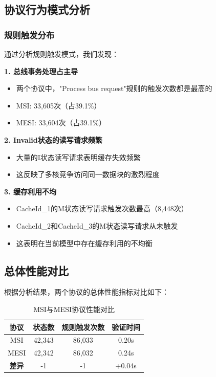 \documentclass[a4paper]{article}
\begin{document}
\subsection{协议行为模式分析}

\subsubsection{规则触发分布}

通过分析规则触发模式，我们发现：

\textbf{1. 总线事务处理占主导}
\begin{itemize}
    \item 两个协议中，"Process bus request"规则的触发次数都是最高的
    \item MSI: 33,605次（占39.1\%）
    \item MESI: 33,604次（占39.1\%）
\end{itemize}

\textbf{2. Invalid状态的读写请求频繁}
\begin{itemize}
    \item 大量的I状态读写请求表明缓存失效频繁
    \item 这反映了多核竞争访问同一数据块的激烈程度
\end{itemize}

\textbf{3. 缓存利用不均}
\begin{itemize}
    \item CacheId\_1的M状态读写请求触发次数最高（8,448次）
    \item CacheId\_2和CacheId\_3的M状态读写请求从未触发
    \item 这表明在当前模型中存在缓存利用的不均衡
\end{itemize}

\subsection{总体性能对比}

根据分析结果，两个协议的总体性能指标对比如下：

\begin{table}[H]
\centering
\begin{tabular}{|c|c|c|c|}
\hline
\textbf{协议} & \textbf{状态数} & \textbf{规则触发次数} & \textbf{验证时间} \\
\hline
MSI & 42,343 & 86,033 & 0.20s \\
MESI & 42,342 & 86,032 & 0.24s \\
\hline
\textbf{差异} & -1 & -1 & +0.04s \\
\hline
\end{tabular}
\caption{MSI与MESI协议性能对比}
\end{table}
\end{document}
